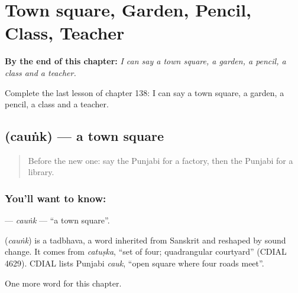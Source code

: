 
\chapter{Town square, Garden, Pencil, Class, Teacher}
\label{ch:pa-town-square-garden-pencil-class-teacher}

\begin{chapteropening}
\textbf{By the end of this chapter:} \emph{I can say a town square, a garden, a pencil, a class and a teacher.}

Complete the last lesson of chapter 138: I can say a town square, a garden, a pencil, a class and a teacher.
\end{chapteropening}

\section[\texorpdfstring{\pa{ਚੌਂਕ} (cauṅk)}{ਚੌਂਕ (cauṅk)}]{ (cauṅk) — a town square}

\label{lesson:PA-C138-caunk}



\begin{quote}
Before the new one: say the Punjabi for a factory, then the Punjabi for a library.
\end{quote}

\subsection*{You'll want to know: }
\textbf{} — \emph{cauṅk} — \textquotedblleft{}a town square\textquotedblright{}.

\begin{cousinweb}
\textbf{} (\emph{cauṅk}) is a tadbhava, a word inherited from Sanskrit and reshaped by sound change. It comes from \emph{catuṣka}, \textquotedblleft{}set of four; quadrangular courtyard\textquotedblright{} (CDIAL 4629). CDIAL lists Punjabi \emph{cauk}, \textquotedblleft{}open square where four roads meet\textquotedblright{}.
\end{cousinweb}

\begin{grammarlens}[title={What you've built}]
One more word for this chapter.
\end{grammarlens}


